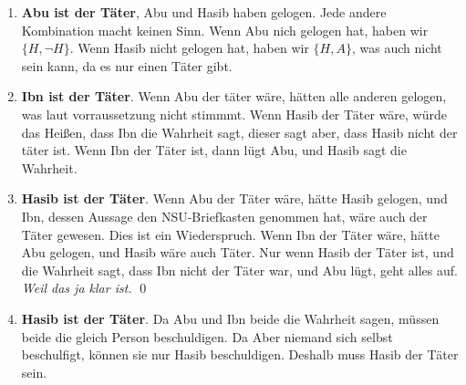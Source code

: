 \begin{enumerate}[1.]
	\item \textbf{Abu ist der Täter}, Abu und Hasib haben gelogen. Jede andere Kombination macht keinen Sinn.
		  Wenn Abu nich gelogen hat, haben wir $\{H,\lnot H\}$. Wenn Hasib nicht gelogen hat, haben wir $\{H,A\}$, was 
		  auch nicht sein kann, da es nur einen Täter gibt.
	\item \textbf{Ibn ist der Täter}. Wenn Abu der täter wäre, hätten alle anderen gelogen, was laut vorraussetzung 
	nicht stimmmt. Wenn Hasib der Täter wäre, würde das Heißen, dass Ibn die Wahrheit sagt, dieser sagt aber, dass Hasib 
	nicht der täter ist. Wenn Ibn der Täter ist, dann lügt Abu, und Hasib sagt die Wahrheit.
	\item \textbf{Hasib ist der Täter}. Wenn Abu der Täter wäre, hätte Hasib gelogen, und Ibn, dessen Aussage den 
	NSU-Briefkasten genommen hat, wäre auch der Täter gewesen. Dies ist ein Wiederspruch. Wenn Ibn der Täter wäre, hätte 
	Abu gelogen, und Hasib wäre auch Täter. Nur wenn Hasib der Täter ist, und die Wahrheit sagt, dass Ibn nicht der Täter 
	war, und Abu lügt, geht alles auf. \emph{Weil das ja klar ist.} \qed
	\item \textbf{Hasib ist der Täter}. Da Abu und Ibn beide die Wahrheit sagen, müssen beide die gleich Person 
	beschuldigen. Da Aber niemand sich selbst beschulfigt, können sie nur Hasib beschuldigen. Deshalb muss Hasib der 
	Täter sein.
\end{enumerate}



\vfill\centering


